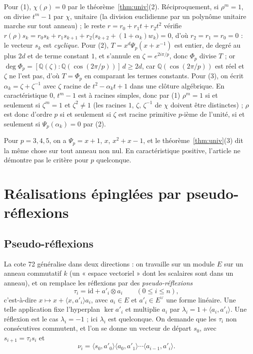\documentclass[11pt,a4paper]{amsart}
\theoremstyle{definition}
\theoremstyle{plain}
\theoremstyle{remark}
\newcommand{\Q}{\mathbb Q}
\newcommand{\id}{\mathrm{id}}
\begin{document}
Pour (1), $\chi(\rho) = 0$ par le théorème~\ref{thm:univ}(2). Réciproquement, si $\rho^m = 1$, on divise $t^m - 1$ par $\chi$, unitaire (la division euclidienne par un polynôme unitaire marche sur tout anneau) ; le reste $r = r_0 + r_1t + r_2t^2$ vérifie $r(\rho)s_k = r_0s_k + r_1s_{k+1} + r_2\bigl(s_{k+2} + (1+\alpha_k)w_k\bigr) = 0$, d'où $r_2 = r_1 = r_0 = 0$ : le vecteur $s_k$ est \emph{cyclique}. Pour (2), $T = x^d\Psi_p(x + x^{-1})$ est entier, de degré au plus $2d$ et de terme constant $1$, et s'annule en $\zeta = e^{2i\pi/p}$, donc $\Phi_p$ divise $T$ ; or $\deg\Phi_p = [\Q(\zeta):\Q(\cos(2\pi/p))]\,d \ge 2d$, car $\Q(\cos(2\pi/p))$ est réel et $\zeta$ ne l'est pas, d'où $T = \Phi_p$ en comparant les termes constants. Pour (3), on écrit $\alpha_k = \zeta + \zeta^{-1}$ avec $\zeta$ racine de $t^2 - \alpha_kt + 1$ dans une clôture algébrique. En caractéristique $0$, $t^m - 1$ est à racines simples, donc par (1) $\rho^m = 1$ si et seulement si $\zeta^m = 1$ et $\zeta^2 \ne 1$ (les racines $1$, $\zeta$, $\zeta^{-1}$ de $\chi$ doivent être distinctes) ; $\rho$ est donc d'ordre $p$ si et seulement si $\zeta$ est racine primitive $p$-ième de l'unité, si et seulement si $\Psi_p(\alpha_k) = 0$ par (2).

Pour $p = 3, 4, 5$, on a $\Psi_p = x + 1$, $x$, $x^2 + x - 1$, et le théorème~\ref{thm:univ}(3) dit la même chose sur tout anneau non nul. En caractéristique positive, l'article ne démontre pas le critère pour $p$ quelconque.

\section{Réalisations épinglées par pseudo-réflexions}

\subsection{Pseudo-réflexions}

La cote 72 généralise dans deux directions : on travaille sur un module $E$ sur un anneau commutatif $k$ (un « espace vectoriel » dont les scalaires sont dans un anneau), et on remplace les réflexions par des \emph{pseudo-réflexions}
\[
\tau_i = \id + a'_i \otimes a_i \qquad (0 \le i \le n),
\]
c'est-à-dire $x \mapsto x + \langle x, a'_i\rangle a_i$, avec $a_i \in E$ et $a'_i \in E^\vee$ une forme linéaire. Une telle application fixe l'hyperplan $\ker a'_i$ et multiplie $a_i$ par $\lambda_i = 1 + \langle a_i, a'_i\rangle$. Une réflexion est le cas $\lambda_i = -1$ ; ici $\lambda_i$ est quelconque. On demande que les $\tau_i$ non consécutives commutent, et l'on se donne un vecteur de départ $s_0$, avec $s_{i+1} = \tau_is_i$ et
\[
\nu_i = \langle s_0, a'_0\rangle\langle a_0, a'_1\rangle\cdots\langle a_{i-1}, a'_i\rangle.
\]
\end{document}
